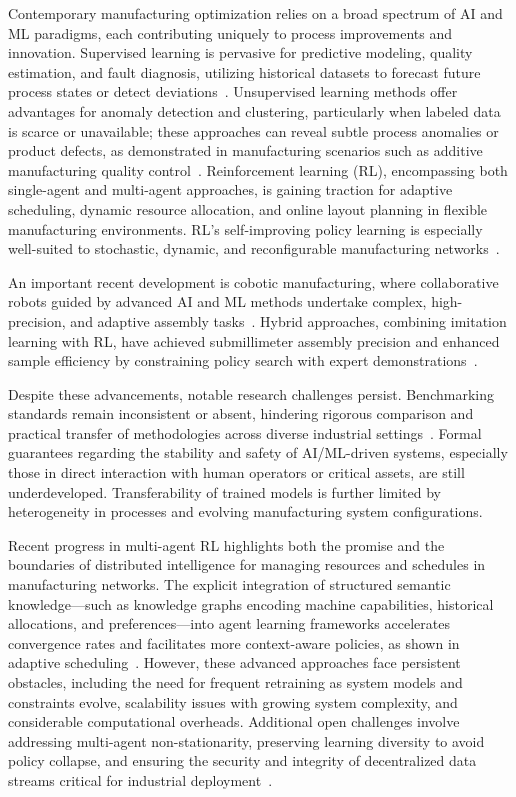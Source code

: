 \documentclass[sigconf]{acmart}
\begin{document}
Contemporary manufacturing optimization relies on a broad spectrum of AI and ML paradigms, each contributing uniquely to process improvements and innovation. Supervised learning is pervasive for predictive modeling, quality estimation, and fault diagnosis, utilizing historical datasets to forecast future process states or detect deviations~\cite{ref2,ref6,ref13,ref14,ref19,ref20,ref27,ref30,ref37,ref38,ref42,ref44,ref45,ref50,ref52}. Unsupervised learning methods offer advantages for anomaly detection and clustering, particularly when labeled data is scarce or unavailable; these approaches can reveal subtle process anomalies or product defects, as demonstrated in manufacturing scenarios such as additive manufacturing quality control~\cite{ref20,ref27}. Reinforcement learning (RL), encompassing both single-agent and multi-agent approaches, is gaining traction for adaptive scheduling, dynamic resource allocation, and online layout planning in flexible manufacturing environments. RL's self-improving policy learning is especially well-suited to stochastic, dynamic, and reconfigurable manufacturing networks~\cite{ref6,ref13,ref14,ref19,ref30,ref38,ref44,ref56}.

An important recent development is cobotic manufacturing, where collaborative robots guided by advanced AI and ML methods undertake complex, high-precision, and adaptive assembly tasks~\cite{ref42,ref44,ref45}. Hybrid approaches, combining imitation learning with RL, have achieved submillimeter assembly precision and enhanced sample efficiency by constraining policy search with expert demonstrations~\cite{ref44}.

Despite these advancements, notable research challenges persist. Benchmarking standards remain inconsistent or absent, hindering rigorous comparison and practical transfer of methodologies across diverse industrial settings~\cite{ref56}. Formal guarantees regarding the stability and safety of AI/ML-driven systems, especially those in direct interaction with human operators or critical assets, are still underdeveloped. Transferability of trained models is further limited by heterogeneity in processes and evolving manufacturing system configurations.

Recent progress in multi-agent RL highlights both the promise and the boundaries of distributed intelligence for managing resources and schedules in manufacturing networks. The explicit integration of structured semantic knowledge---such as knowledge graphs encoding machine capabilities, historical allocations, and preferences---into agent learning frameworks accelerates convergence rates and facilitates more context-aware policies, as shown in adaptive scheduling~\cite{ref13,ref14}. However, these advanced approaches face persistent obstacles, including the need for frequent retraining as system models and constraints evolve, scalability issues with growing system complexity, and considerable computational overheads. Additional open challenges involve addressing multi-agent non-stationarity, preserving learning diversity to avoid policy collapse, and ensuring the security and integrity of decentralized data streams critical for industrial deployment~\cite{ref13,ref14,ref45,ref56}.
\end{document}
